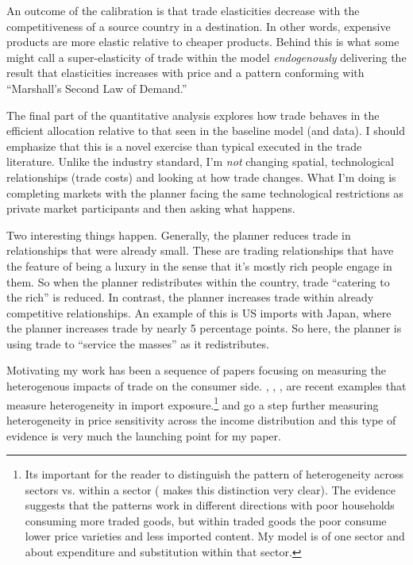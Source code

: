 \documentclass[12pt,pdftex]{article}
\begin{document}
\begin{onehalfspacing}
An outcome of the calibration is that trade elasticities decrease with the competitiveness of a source country in a destination. In other words, expensive products are more elastic relative to cheaper products. Behind this is what some might call a super-elasticity of trade within the model \emph{endogenously} delivering the result that elasticities increases with price and a pattern conforming with ``Marshall's Second Law of Demand.''

The final part of the quantitative analysis explores how trade behaves in the efficient allocation relative to that seen in the baseline model (and data). I should emphasize that this is a novel exercise than typical executed in the trade literature. Unlike the industry standard, I'm \emph{not} changing spatial, technological relationships (trade costs) and looking at how trade changes. What I'm doing is completing markets with the planner facing the same technological restrictions as private market participants and then asking what happens.

Two interesting things happen. Generally, the planner reduces trade in relationships that were already small. These are trading relationships that have the feature of being a luxury in the sense that it's mostly rich people engage in them. So when the planner redistributes within the country, trade ``catering to the rich'' is reduced. In contrast, the planner increases trade within already competitive relationships. An example of this is US imports with Japan, where the planner increases trade by nearly 5 percentage points. So here, the planner is using trade to ``service the masses'' as it redistributes.


Motivating my work has been a sequence of papers focusing on measuring the heterogenous impacts of trade on the consumer side. \citet{fajgelbaum2016measuring}, \citet{carroll2020heterogeneous}, \citet{borusyak2021distributional}, \citet{jaccardtoronto} are recent examples that measure heterogeneity in import exposure.\footnote{Its important for the reader to distinguish the pattern of heterogeneity across sectors vs. within a sector (\citet{cravino2017distributional} makes this distinction very clear). The evidence suggests that the patterns work in different directions with poor households consuming more traded goods, but within traded goods the poor consume lower price varieties and less imported content. My model is of one sector and about expenditure and substitution within that sector.} \citet*{auer2022unequal} and \citet*{colicev2022impact} go a step further measuring heterogeneity in price sensitivity across the income distribution and this type of evidence is very much the launching point for my paper.


\end{onehalfspacing}
\end{document}
